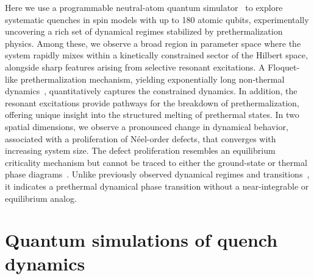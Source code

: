 \documentclass[english,floatfix,twocolumn,showpacs, aps, prx, reprint, superscriptaddress, longbibliography]{revtex4-2}
\begin{document}
Here we use a programmable neutral-atom quantum simulator~\cite{aquila:2023,Bernien:2017,Bluvstein:2021,GonzalezCuadra:2024} 
to explore systematic quenches in spin models with up to 180 atomic qubits,  experimentally uncovering a rich set of dynamical regimes stabilized by prethermalization physics. Among these, we observe a broad region in parameter space where the system rapidly mixes within a kinetically constrained sector of the Hilbert space, alongside sharp features arising from selective resonant excitations. A Floquet-like prethermalization mechanism, yielding exponentially long non‑thermal dynamics~\cite{Abanin:2017,Mori:2018}, quantitatively captures the constrained dynamics. In addition, the resonant excitations provide pathways for the breakdown of prethermalization, offering unique insight into the structured melting of prethermal states. In two spatial dimensions, we observe a pronounced change in dynamical behavior, associated with a proliferation of N{\'e}el-order defects, that converges with increasing system size. 
The defect proliferation resembles an equilibrium criticality mechanism but cannot be traced to either the ground-state or thermal phase diagrams~\cite{Keesling:2019,Ebadi:2021}. Unlike previously observed dynamical regimes and transitions~\cite{Daley:2022,Smale:2019,Muniz:2020,Chu:2020,Karch:2025,Zhang:2017,De:2025,Xu:2020}, it indicates a prethermal dynamical phase transition without a near-integrable or equilibrium analog.

  






\section*{Quantum simulations of quench dynamics}
\label{sec:setup}
\end{document}
